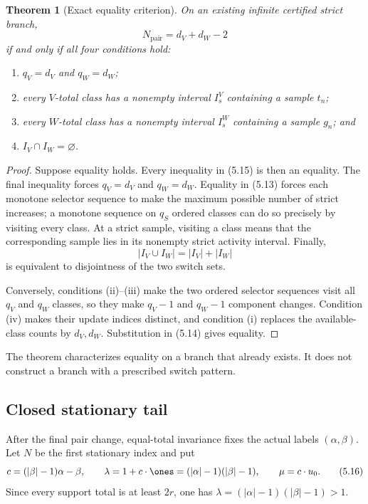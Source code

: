\documentclass[11pt]{article}
\newtheorem{theorem}{Theorem}[section]
\theoremstyle{definition}
\theoremstyle{remark}
\begin{document}
\begin{theorem}[Exact equality criterion]
\label{thm:equality}
On an existing infinite certified strict branch,
\[
 N_{\mathrm{pair}}=d_V+d_W-2
\]
if and only if all four conditions hold:
\begin{enumerate}[label=(\roman*)]
\item \(q_V=d_V\) and \(q_W=d_W\);
\item every \(V\)-total class has a nonempty interval \(I_s^V\) containing
a sample \(t_n\);
\item every \(W\)-total class has a nonempty interval \(I_s^W\) containing
a sample \(g_n\); and
\item \(I_V\cap I_W=\varnothing\).
\end{enumerate}
\end{theorem}

\begin{proof}
Suppose equality holds.  Every inequality in (5.15) is then an equality.
The final inequality forces \(q_V=d_V\) and \(q_W=d_W\).  Equality in
(5.13) forces each monotone selector sequence to make the maximum possible
number of strict increases; a monotone sequence on \(q_S\) ordered classes
can do so precisely by visiting every class.  At a strict sample, visiting
a class means that the corresponding sample lies in its nonempty strict
activity interval.  Finally,
\[
 |I_V\cup I_W|=|I_V|+|I_W|
\]
is equivalent to disjointness of the two switch sets.

Conversely, conditions (ii)--(iii) make the two ordered selector sequences
visit all \(q_V\) and \(q_W\) classes, so they make \(q_V-1\) and
\(q_W-1\) component changes.  Condition (iv) makes their update indices
distinct, and condition (i) replaces the available-class counts by
\(d_V,d_W\).  Substitution in (5.14) gives equality.
\end{proof}

The theorem characterizes equality on a branch that already exists.  It
does not construct a branch with a prescribed switch pattern.

\subsection{Closed stationary tail}

After the final pair change, equal-total invariance fixes the actual labels
\((\alpha,\beta)\).  Let \(N\) be the first stationary index and put
\[
 c=(|\beta|-1)\alpha-\beta,\qquad
 \lambda=1+c\cdot\ones=(|\alpha|-1)(|\beta|-1),\qquad
 \mu=c\cdot u_0.
\tag{5.16}
\]
Since every support total is at least \(2r\), one has
\(\lambda=(|\alpha|-1)(|\beta|-1)>1\).
\end{document}
